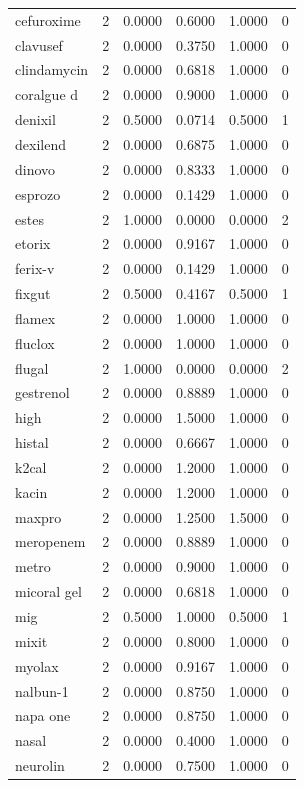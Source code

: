 \begin{longtable}{p{3.0cm}rrrrr}
cefuroxime & 2 & 0.0000 & 0.6000 & 1.0000 & 0 \\
clavusef & 2 & 0.0000 & 0.3750 & 1.0000 & 0 \\
clindamycin & 2 & 0.0000 & 0.6818 & 1.0000 & 0 \\
coralgue d & 2 & 0.0000 & 0.9000 & 1.0000 & 0 \\
denixil & 2 & 0.5000 & 0.0714 & 0.5000 & 1 \\
dexilend & 2 & 0.0000 & 0.6875 & 1.0000 & 0 \\
dinovo & 2 & 0.0000 & 0.8333 & 1.0000 & 0 \\
esprozo & 2 & 0.0000 & 0.1429 & 1.0000 & 0 \\
estes & 2 & 1.0000 & 0.0000 & 0.0000 & 2 \\
etorix & 2 & 0.0000 & 0.9167 & 1.0000 & 0 \\
ferix-v & 2 & 0.0000 & 0.1429 & 1.0000 & 0 \\
fixgut & 2 & 0.5000 & 0.4167 & 0.5000 & 1 \\
flamex & 2 & 0.0000 & 1.0000 & 1.0000 & 0 \\
fluclox & 2 & 0.0000 & 1.0000 & 1.0000 & 0 \\
flugal & 2 & 1.0000 & 0.0000 & 0.0000 & 2 \\
gestrenol & 2 & 0.0000 & 0.8889 & 1.0000 & 0 \\
high & 2 & 0.0000 & 1.5000 & 1.0000 & 0 \\
histal & 2 & 0.0000 & 0.6667 & 1.0000 & 0 \\
k2cal & 2 & 0.0000 & 1.2000 & 1.0000 & 0 \\
kacin & 2 & 0.0000 & 1.2000 & 1.0000 & 0 \\
maxpro & 2 & 0.0000 & 1.2500 & 1.5000 & 0 \\
meropenem & 2 & 0.0000 & 0.8889 & 1.0000 & 0 \\
metro & 2 & 0.0000 & 0.9000 & 1.0000 & 0 \\
micoral gel & 2 & 0.0000 & 0.6818 & 1.0000 & 0 \\
mig & 2 & 0.5000 & 1.0000 & 0.5000 & 1 \\
mixit & 2 & 0.0000 & 0.8000 & 1.0000 & 0 \\
myolax & 2 & 0.0000 & 0.9167 & 1.0000 & 0 \\
nalbun-1 & 2 & 0.0000 & 0.8750 & 1.0000 & 0 \\
napa one & 2 & 0.0000 & 0.8750 & 1.0000 & 0 \\
nasal & 2 & 0.0000 & 0.4000 & 1.0000 & 0 \\
neurolin & 2 & 0.0000 & 0.7500 & 1.0000 & 0 \\

\end{longtable}
